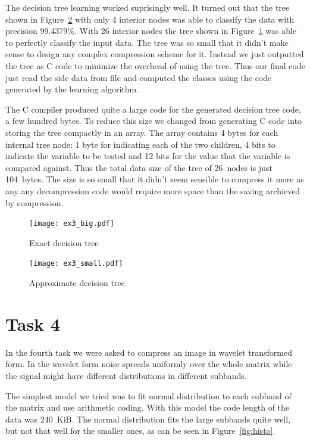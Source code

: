 \documentclass{article}
\begin{document}
The decision tree learning worked suprisingly well.
It turned out that the tree shown in Figure~\ref{fig:ex3small} with only 4 interior nodes was able to classify the data with precision 99.4379\%.
With 26 interior nodes the tree shown in Figure~\ref{fig:ex3big} was able to perfectly classify the input data.
The tree was so small that it didn't make sense to design any complex compression scheme for it.
Instead we just outputted the tree as C code to minimize the overhead of using the tree.
Thus our final code just read the side data from file and computed the classes using the code generated by the learning algorithm.

The C compiler produced quite a large code for the generated decision tree code, a few hundred bytes.
To reduce this size we changed from generating C code into storing the tree compactly in an array.
The array contains 4 bytes for each internal tree node: 1 byte for indicating each of the two children, 4 bits to indicate the variable to be tested and 12 bits for the value that the variable is compared against.
Thus the total data size of the tree of 26~nodes is just 104~bytes.
The size is so small that it didn't seem sensible to compress it more as any any decompression code would require more space than the saving archieved by compression.

\begin{figure}
    \centerline{\texttt{[image: ex3\_big.pdf]}}
    \caption{Exact decision tree}\label{fig:ex3big}
\end{figure}

\begin{figure}
    \begin{center}
    \texttt{[image: ex3\_small.pdf]}
    \end{center}
    \caption{Approximate decision tree}\label{fig:ex3small}
\end{figure}

\section{Task 4}

In the fourth task we were asked to compress an image in wavelet transformed form. In the wavelet form noise spreads
uniformly over the whole matrix while the signal might have different distributions in different subbands.

The simplest model we tried was to fit normal distribution to each subband of the matrix and use arithmetic coding.
With this model the code length of the data was 240~KiB. The normal distribution fits the large subbands quite well, but not that well for the smaller ones, as can be seen in Figure~\ref{fig:histo}.
\end{document}
